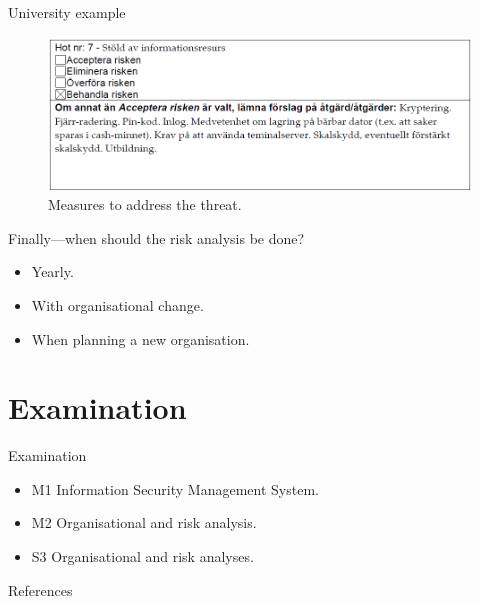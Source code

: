 \documentclass{beamer}
\begin{document}
\begin{frame}{University example}
  \begin{figure}
    \includegraphics[width=\textwidth]{miun-atgard.png}
    \caption{Measures to address the threat.}
  \end{figure}
\end{frame}

\begin{frame}{Finally---when should the risk analysis be done?}
  \begin{itemize}
    \item Yearly.
    \item With organisational change.
    \item When planning a new organisation.
  \end{itemize}
\end{frame}


\section[Assignments]{Examination}

\begin{frame}{Examination}
  \begin{itemize}
    \item M1 Information Security Management System.
    \item M2 Organisational and risk analysis.
    \item S3 Organisational and risk analyses.
  \end{itemize}
\end{frame}



\begin{frame}[allowframebreaks]{References}
  \small
  \printbibliography{}
\end{frame}
\end{document}
